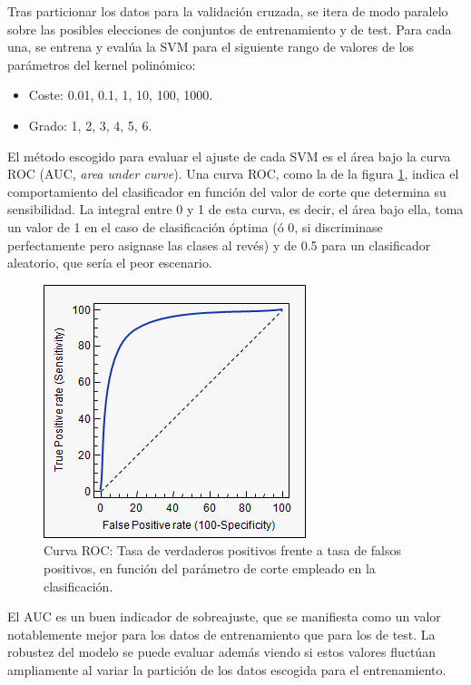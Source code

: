 \documentclass[12pt]{scrartcl}
\begin{document}
Tras particionar los datos para la validación cruzada, se itera de modo paralelo sobre las posibles elecciones de conjuntos de entrenamiento y de test. Para cada una, se entrena y evalúa la SVM para el siguiente rango de valores de los parámetros del kernel polinómico:
\begin{itemize}
\item Coste: 0.01, 0.1, 1, 10, 100, 1000.
\item Grado: 1, 2, 3, 4, 5, 6.
\end{itemize}

El método escogido para evaluar el ajuste de cada SVM es el área bajo la curva ROC (AUC, \textit{area under curve}). Una curva ROC, como la de la figura \ref{fig:roc}, indica el comportamiento del clasificador en función del valor de corte que determina su sensibilidad. La integral entre 0 y 1 de esta curva, es decir, el área bajo ella, toma un valor de 1 en el caso de clasificación óptima (ó 0, si discriminase perfectamente pero asignase las clases al revés) y de 0.5 para un clasificador aleatorio, que sería el peor escenario.\par

\begin{figure}[hb]
\centering
\includegraphics [width=5.45 cm]{roc}
\caption{Curva ROC: Tasa de verdaderos positivos frente a tasa de falsos positivos, en función del parámetro de corte empleado en la clasificación.}
\label{fig:roc}
\end{figure}


El AUC es un buen indicador de sobreajuste, que se manifiesta como un valor notablemente mejor para los datos de entrenamiento que para los de test. La robustez del modelo se puede evaluar además viendo si estos valores fluctúan ampliamente al variar la partición de los datos escogida para el entrenamiento.\par
\end{document}
